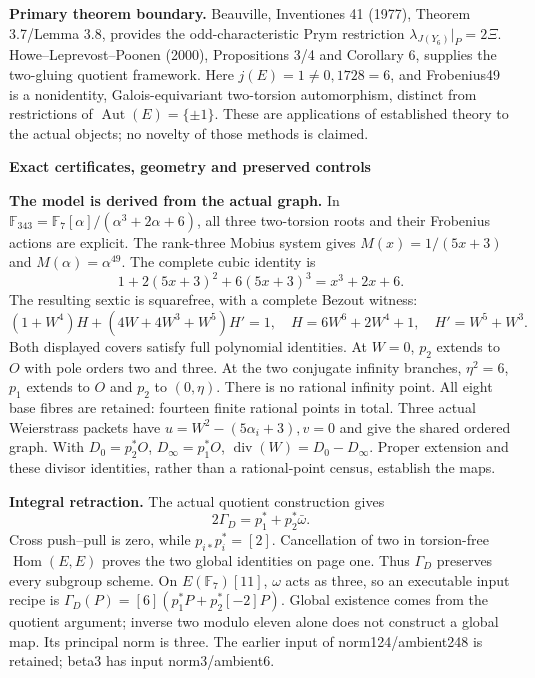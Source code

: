 \documentclass[10pt,a4paper]{article}
\begin{document}
\textbf{Primary theorem boundary.} Beauville, Inventiones 41 (1977),
Theorem 3.7/Lemma 3.8, provides the odd-characteristic Prym restriction
$\lambda_{J(Y_6)}|_P=2\Xi$. Howe--Leprevost--Poonen (2000),
Propositions 3/4 and Corollary 6, supplies the two-gluing quotient
framework. Here $j(E)=1\ne0,1728=6$, and Frobenius49 is a nonidentity,
Galois-equivariant two-torsion automorphism, distinct from restrictions
of $\operatorname{Aut}(E)=\{\pm1\}$. These are applications of established
theory to the actual objects; no novelty of those methods is claimed.

\newpage
{\Large\bfseries Exact certificates, geometry and preserved controls}\par

\textbf{The model is derived from the actual graph.} In
$\mathbb F_{343}=\mathbb F_7[\alpha]/(\alpha^3+2\alpha+6)$, all three
two-torsion roots and their Frobenius actions are explicit. The rank-three
Mobius system gives $M(x)=1/(5x+3)$ and $M(\alpha)=\alpha^{49}$.
The complete cubic identity is
\[
1+2(5x+3)^2+6(5x+3)^3=x^3+2x+6.
\]
The resulting sextic is squarefree, with a complete Bezout witness:
\[
(1+W^4)H+(4W+4W^3+W^5)H'=1,\quad
H=6W^6+2W^4+1,\quad H'=W^5+W^3.
\]
Both displayed covers satisfy full polynomial identities. At $W=0$,
$p_2$ extends to $O$ with pole orders two and three. At the two conjugate
infinity branches, $\eta^2=6$, $p_1$ extends to $O$ and $p_2$ to
$(0,\eta)$. There is no rational infinity point. All eight base fibres
are retained: fourteen finite rational points in total. Three actual
Weierstrass packets have $u=W^2-(5\alpha_i+3),v=0$ and give the shared
ordered graph. With $D_0=p_2^*O$, $D_\infty=p_1^*O$,
$\operatorname{div}(W)=D_0-D_\infty$. Proper extension and these divisor
identities, rather than a rational-point census, establish the maps.

\textbf{Integral retraction.} The actual quotient construction gives
\[
2\Gamma_D=p_1^*+p_2^*\bar\omega.
\]
Cross push--pull is zero, while $p_{i*}p_i^*=[2]$. Cancellation of
two in torsion-free $\operatorname{Hom}(E,E)$ proves the two global
identities on page one. Thus $\Gamma_D$ preserves every subgroup scheme.
On $E(\mathbb F_7)[11]$, $\omega$ acts as three, so an executable input
recipe is $\Gamma_D(P)=[6](p_1^*P+p_2^*[-2]P)$. Global existence comes
from the quotient argument; inverse two modulo eleven alone does not
construct a global map. Its principal norm is three. The earlier input
of norm124/ambient248 is retained; beta3 has input norm3/ambient6.
\end{document}
